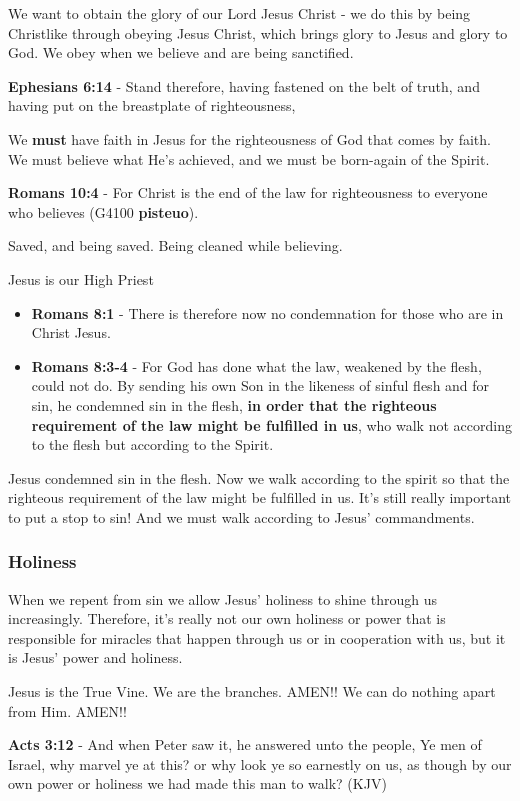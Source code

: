 \documentclass[11pt]{article}
\begin{document}
We want to obtain the glory of our Lord Jesus Christ - we do this by being Christlike through obeying Jesus Christ, which brings glory to Jesus and glory to God. We obey when we believe and are being sanctified.

\textbf{Ephesians 6:14} - Stand therefore, having fastened on the belt of truth, and having put on the breastplate of righteousness,

We \textbf{must} have faith in Jesus for the righteousness of God that comes by faith.
We must believe what He's achieved, and we must be born-again of the Spirit.

\textbf{Romans 10:4} - For Christ is the end of the law for righteousness to everyone who believes (G4100 \textbf{pisteuo}).

Saved, and being saved. Being cleaned while believing.

Jesus is our High Priest
\begin{itemize}
\item \textbf{Romans 8:1} - There is therefore now no condemnation for those who are in Christ Jesus.
\item \textbf{Romans 8:3-4} - For God has done what the law, weakened by the flesh, could not do. By sending his own Son in the likeness of sinful flesh and for sin, he condemned sin in the flesh, \textbf{in order that the righteous requirement of the law might be fulfilled in us}, who walk not according to the flesh but according to the Spirit.
\end{itemize}

Jesus condemned sin in the flesh. Now we walk according to the spirit so that the righteous requirement of the law might be fulfilled in us.
It's still really important to put a stop to sin! And we must walk according to Jesus' commandments.

\subsubsection{Holiness}
\label{sec:orge56d87c}
When we repent from sin we allow Jesus' holiness to shine through us increasingly.
Therefore, it's really not our own holiness or power that is responsible for miracles that happen through us or in cooperation with us, but it is Jesus' power and holiness.

Jesus is the True Vine. We are the branches. AMEN!! We can do nothing apart from Him. AMEN!!

\textbf{Acts 3:12} - And when Peter saw it, he answered unto the people, Ye men of Israel, why marvel ye at this? or why look ye so earnestly on us, as though by our own power or holiness we had made this man to walk? (KJV)
\end{document}
